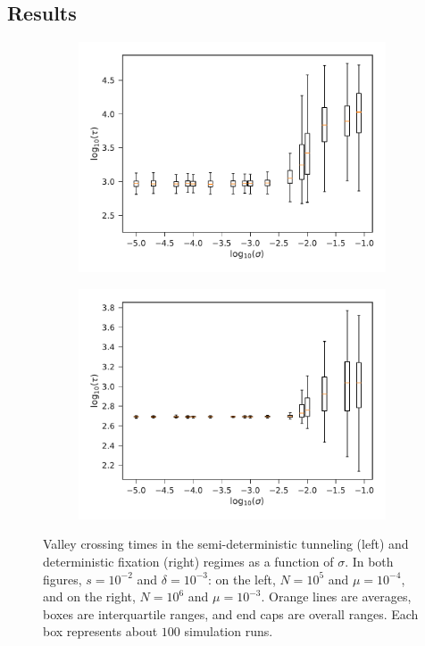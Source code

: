 \documentclass[rmp]{revtex4}
\begin{document}
\begin{spacing}{1.5}
\section*{Results}

\begin{figure}
\begin{subfigure}[b]{0.4\textwidth}
\includegraphics[width=\textwidth]{Figures/det_tunnel.pdf}
\end{subfigure}
\begin{subfigure}[b]{0.4\textwidth}
\includegraphics[width=\textwidth]{Figures/det_fix.pdf}
\end{subfigure}
\caption{Valley crossing times in the semi-deterministic tunneling (left) and deterministic fixation (right) regimes as a function of $\sigma$. In both figures, $s = 10^{-2}$ and $\delta = 10^{-3}$: on the left, $N = 10^5$ and $\mu = 10^{-4}$, and on the right, $N = 10^6$ and $\mu = 10^{-3}$. Orange lines are averages, boxes are interquartile ranges, and end caps are overall ranges. Each box represents about $100$ simulation runs.}
\label{fig:deterministic}
\end{figure}



\end{spacing}
\end{document}
